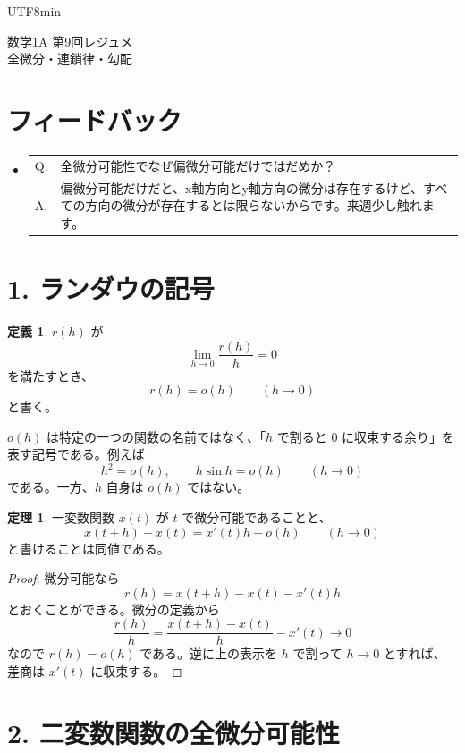 \documentclass[a4paper,12pt]{article}
\makeatletter
\newcommand{\feedbackqa}[2]{%
\item[]
\begin{tabular}[t]{@{}p{1.8em}@{\hspace{0.4em}}p{\dimexpr\linewidth-2.2em\relax}@{}}
Q. & #1 \\
A. & #2
\end{tabular}
\par\smallskip\hrulefill
}
\makeatother
\begin{document}
\ifPDFTeX
\begin{CJK}{UTF8}{min}
\fi

\theoremstyle{definition}
\newtheorem*{definition}{定義}
\newtheorem*{theorem}{定理}
\newtheorem*{example}{例}
\newtheorem*{remark}{注意}
\renewcommand{\proofname}{\normalfont 証明}

\begin{center}
{\LARGE 数学1A 第9回レジュメ}\\[0.4em]
全微分・連鎖律・勾配
\end{center}

\section*{フィードバック}

\begin{itemize}[leftmargin=1.5em,itemsep=0.7em,topsep=0.3em]
\feedbackqa{全微分可能性でなぜ偏微分可能だけではだめか？}{偏微分可能だけだと、x軸方向とy軸方向の微分は存在するけど、すべての方向の微分が存在するとは限らないからです。来週少し触れます。}
\end{itemize}

\section*{1. ランダウの記号}

\begin{definition}
$r(h)$ が
\[
\lim_{h\to0}\frac{r(h)}{h}=0
\]
を満たすとき、
\[
r(h)=o(h)\qquad (h\to0)
\]
と書く。
\end{definition}

$o(h)$ は特定の一つの関数の名前ではなく、「$h$ で割ると $0$ に収束する余り」を表す記号である。例えば
\[
h^2=o(h),\qquad h\sin h=o(h)\qquad (h\to0)
\]
である。一方、$h$ 自身は $o(h)$ ではない。

\begin{theorem}
一変数関数 $x(t)$ が $t$ で微分可能であることと、
\[
x(t+h)-x(t)=x'(t)h+o(h)\qquad (h\to0)
\]
と書けることは同値である。
\end{theorem}

\begin{proof}
微分可能なら
\[
r(h)=x(t+h)-x(t)-x'(t)h
\]
とおくことができる。微分の定義から
\[
\frac{r(h)}{h}
=\frac{x(t+h)-x(t)}{h}-x'(t)\longrightarrow0
\]
なので $r(h)=o(h)$ である。逆に上の表示を $h$ で割って $h\to0$ とすれば、差商は $x'(t)$ に収束する。
\end{proof}


\section*{2. 二変数関数の全微分可能性}


\end{CJK}
\end{document}

